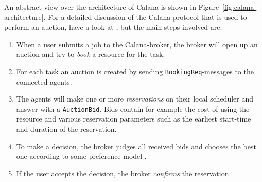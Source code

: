 An  abstract   view  over   the  architecture  of   Calana  is   shown  in
Figure~\ref{fig:calana-architecture}.   For a  detailed discussion  of the
Calana-protocol  that  is used  to  perform an  auction,  have  a look  at
\cite{dalheimer06calanaprotocol,petry06}, but  the  main steps  involved
are:
\begin{enumerate}
\item When a user submits a job to the Calana-broker, the broker will open
  up an auction and try to \emph{book} a resource for the task.
\item    For   each   task    an   auction    is   created    by   sending
  \texttt{BookingReq}-messages to the connected agents.
\item The agents will make  one or more \emph{reservations} on their local
  scheduler  and  answer with  a  \texttt{AuctionBid}.   Bids contain  for
  example  the  cost  of   using  the  resource  and  various  reservation
  parameters  such  as  the   earliest  start-time  and  duration  of  the
  reservation.
\item To make a decision, the  broker judges all received bids and chooses
  the     best     one      according     to     some     preference-model
  \cite{dalheimer05agentbased, petry06}.
\item If  the user  accepts the decision,  the broker  \emph{confirms} the
  reservation.
\end{enumerate}

